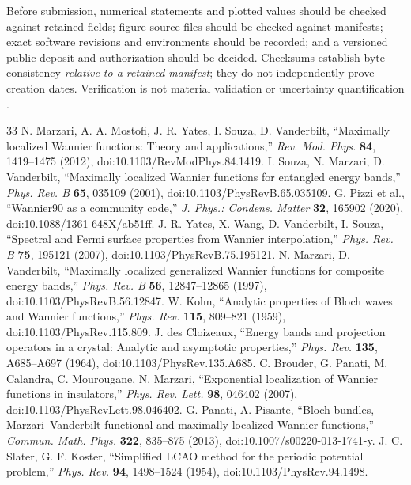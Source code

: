 \documentclass[11pt]{article}
\begin{document}
Before submission, numerical statements and plotted values should be checked against retained fields; figure-source files should be checked against manifests; exact software revisions and environments should be recorded; and a versioned public deposit and authorization should be decided. Checksums establish byte consistency \emph{relative to a retained manifest}; they do not independently prove creation dates. Verification is not material validation or uncertainty quantification \cite{roache1998,sandve2013}.

\begin{thebibliography}{33}\small
{} N. Marzari, A. A. Mostofi, J. R. Yates, I. Souza, D. Vanderbilt, ``Maximally localized Wannier functions: Theory and applications,'' \emph{Rev. Mod. Phys.} \textbf{84}, 1419--1475 (2012), doi:10.1103/RevModPhys.84.1419.
 I. Souza, N. Marzari, D. Vanderbilt, ``Maximally localized Wannier functions for entangled energy bands,'' \emph{Phys. Rev. B} \textbf{65}, 035109 (2001), doi:10.1103/PhysRevB.65.035109.
 G. Pizzi et al., ``Wannier90 as a community code,'' \emph{J. Phys.: Condens. Matter} \textbf{32}, 165902 (2020), doi:10.1088/1361-648X/ab51ff.
 J. R. Yates, X. Wang, D. Vanderbilt, I. Souza, ``Spectral and Fermi surface properties from Wannier interpolation,'' \emph{Phys. Rev. B} \textbf{75}, 195121 (2007), doi:10.1103/PhysRevB.75.195121.
 N. Marzari, D. Vanderbilt, ``Maximally localized generalized Wannier functions for composite energy bands,'' \emph{Phys. Rev. B} \textbf{56}, 12847--12865 (1997), doi:10.1103/PhysRevB.56.12847.
 W. Kohn, ``Analytic properties of Bloch waves and Wannier functions,'' \emph{Phys. Rev.} \textbf{115}, 809--821 (1959), doi:10.1103/PhysRev.115.809.
 J. des Cloizeaux, ``Energy bands and projection operators in a crystal: Analytic and asymptotic properties,'' \emph{Phys. Rev.} \textbf{135}, A685--A697 (1964), doi:10.1103/PhysRev.135.A685.
 C. Brouder, G. Panati, M. Calandra, C. Mourougane, N. Marzari, ``Exponential localization of Wannier functions in insulators,'' \emph{Phys. Rev. Lett.} \textbf{98}, 046402 (2007), doi:10.1103/PhysRevLett.98.046402.
 G. Panati, A. Pisante, ``Bloch bundles, Marzari--Vanderbilt functional and maximally localized Wannier functions,'' \emph{Commun. Math. Phys.} \textbf{322}, 835--875 (2013), doi:10.1007/s00220-013-1741-y.
 J. C. Slater, G. F. Koster, ``Simplified LCAO method for the periodic potential problem,'' \emph{Phys. Rev.} \textbf{94}, 1498--1524 (1954), doi:10.1103/PhysRev.94.1498.

\end{thebibliography}
\end{document}

